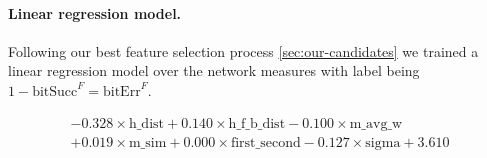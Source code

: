 \paragraph{Linear regression model.} 

Following our best feature selection process \ref{sec:our-candidates} we trained a linear regression model over the network measures with label being $1-\mbox{bitSucc}^F = \mbox{bitErr}^F$. 

\begin{align} 
- 0.328 \times \mbox{h\_dist}
+ 0.140 \times \mbox{h\_f\_b\_dist}
- 0.100 \times \mbox{m\_avg\_w} \nonumber \\
+ 0.019 \times \mbox{m\_sim}
+ 0.000 \times \mbox{first\_second}
- 0.127 \times \mbox{sigma}
+ 3.610
\end{align} 
